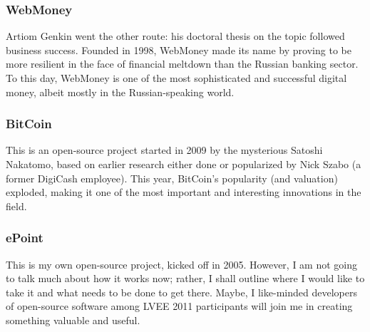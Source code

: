 \documentclass[10pt, a5paper]{article}
\begin{document}
\subsubsection*{WebMoney}
Artiom Genkin went the other route: his doctoral thesis on the topic
followed business success. Founded in 1998, WebMoney made its name by
proving to be more resilient in the face of financial meltdown than the
Russian banking sector. To this day, WebMoney is one of the most
sophisticated and successful digital money, albeit mostly in the
Russian-speaking world.

\subsubsection*{BitCoin}
This is an open-source project started in 2009 by the mysterious Satoshi
Nakatomo, based on earlier research either done or popularized by Nick
Szabo (a former DigiCash employee). This year, BitCoin's popularity (and
valuation) exploded, making it one of the most important and interesting
innovations in the field.

\subsubsection*{ePoint}
This is my own open-source project, kicked off in 2005. However, I am
not going to talk much about how it works now; rather, I shall outline
where I would like to take it and what needs to be done to get there.
Maybe, I like-minded developers of open-source software among LVEE 2011
participants will join me in creating something valuable and useful.
\end{document}
